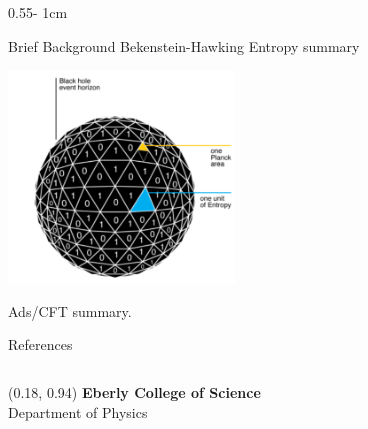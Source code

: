 \documentclass{../psuposter}
\begin{document}
\begin{frame}
\begin{columns}
\begin{column}{0.55\textwidth - 1cm}
    \begin{block}{Brief Background}
        Bekenstein-Hawking Entropy summary
        \cite{zayasMicroscopicAccountBlack2020}
        \begin{center}
	    	\includegraphics[width=0.45\textwidth]{images/bekenstein-hawking-entropy}    		
    	\end{center}
		Ads/CFT summary.
        \cite{zayasMicroscopicAccountBlack2020}

    \end{block}


    \begin{block}{References}
        
		
    \end{block}

\end{column}
\end{columns}


\begin{textblock}{0.5}(0.18, 0.94)
    \color{white}
    \sffamily
    \textbf{Eberly College of Science}
    \\
    Department of Physics
\end{textblock}


\end{frame}
\end{document}
